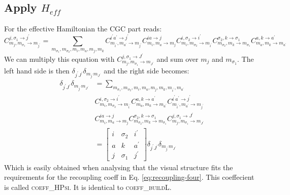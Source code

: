 \documentclass[a4paper,10pt,parskip=full]{scrartcl}
\begin{document}
\subsection{Apply $H_{eff}$}
For the effective Hamiltonian the CGC part reads:
\begin{equation}
  C^{ j,\sigma_1\rightarrow j^\prime}_{ m_j,m_{\sigma_1}\rightarrow m_{j^\prime}} =
  \sum_{m_{\sigma_1},m_{\sigma_2},m_i,m_a,m_j,m_k}
  C^{i^\prime a^\prime\rightarrow j^\prime}_{m_{i^\prime},m_{a^\prime} \rightarrow m_{j^\prime}}
  C^{i a\rightarrow j}_{m_{i},m_{a} \rightarrow m_{j}}
  C^{i,\sigma_2\rightarrow i^\prime}_{m_i,m_{\sigma_2}\rightarrow m_{i^\prime}}
  C^{\sigma_2,k\rightarrow\sigma_1}_{m_{\sigma_2},m_k\rightarrow m_{\sigma_1}}C^{a,k\rightarrow a^\prime}_{m_a,m_k\rightarrow m_{a^\prime}}
\end{equation}
We can multiply this equation with $C^{ j,\sigma_1\rightarrow J^\prime}_{ m_j,m_{\sigma_1}\rightarrow m_{J^\prime}}$
and sum over $m_{j}$ and $m_{\sigma_1}$. The left hand side is then $\delta_{j^\prime J^\prime}\delta_{m_{j^\prime} m_{J^\prime}}$
and the right side becomes:
\begin{equation}
  \begin{split}
  \delta_{j^\prime J^\prime}\delta_{m_{j^\prime} m_{J^\prime}} &=
  \sum_{m_{\sigma_1},m_{\sigma_2},m_i,m_a,m_j,m_k,m_{i^\prime},m_{a^\prime}}\\
  &C^{i,\sigma_2\rightarrow i^\prime}_{m_i,m_{\sigma_2}\rightarrow m_{i^\prime}}
  C^{a,k\rightarrow a^\prime}_{m_a,m_k\rightarrow m_{a^\prime}}
  C^{i^\prime a^\prime\rightarrow j^\prime}_{m_{i^\prime},m_{a^\prime} \rightarrow m_{j^\prime}}\\
  &C^{i a\rightarrow j}_{m_{i},m_{a} \rightarrow m_{j}}
  C^{\sigma_2,k\rightarrow\sigma_1}_{m_{\sigma_2},m_k\rightarrow m_{\sigma_1}}
  C^{ j,\sigma_1\rightarrow J^\prime}_{ m_j,m_{\sigma_1}\rightarrow m_{J^\prime}}\\
  &=
  \begin{bmatrix}
    i & \sigma_2 & i^\prime \\
    a & k & a^\prime \\
    j & \sigma_1 &j^\prime
  \end{bmatrix}\delta_{j^\prime J^\prime}\delta_{m_{j^\prime} m_{J^\prime}}
  \end{split}
\end{equation}
Which is easily obtained when analysing that the visual structure fits the requirements for the recoupling coeff in Eq. \eqref{eq:recoupling-four}.
This coeffecient is called \textsc{coeff\_HPsi}. It is identical to \textsc{coeff\_buildL}.
\end{document}
